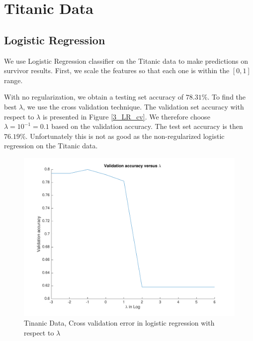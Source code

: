 
\section{Titanic Data}\label{sec:tinanic}

\subsection{Logistic Regression}
We use Logistic Regression classifier on the Titanic data to make predictions on survivor results. First, we scale the features so that each one is within the $[0, 1]$ range. 

With no regularization, we obtain a testing set accuracy of $78.31\%$. To find the best $\lambda$, we use the cross validation technique. The validation set accuracy with respect to $\lambda$ is presented in Figure \ref{3_LR_cv}. We therefore choose $\lambda = 10^{-1} = 0.1$ based on the validation accuracy. The test set accuracy is then $76.19\%$. Unfortunately this is not as good as the non-regularized logistic regression on the Titanic data.

\begin{figure}[hb]
\centering
	\includegraphics[scale=0.6]{hw2_3_cv.pdf}
	\caption{Tinanic Data, Cross validation error in logistic regression with respect to $\lambda$}\label{fig:3_LR_cv}
\end{figure}
